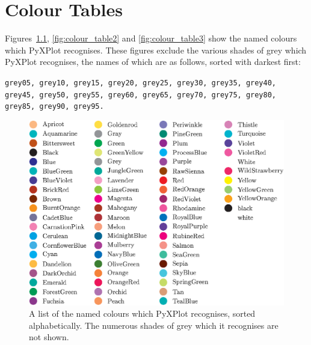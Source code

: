 %
%
%
%
%



\chapter{Colour Tables}
\label{colour_charts}

 Figures~\ref{fig:colour_table1}, \ref{fig:colour_table2}
and \ref{fig:colour_table3} show the named colours which PyXPlot recognises.
These figures exclude the various shades of grey which PyXPlot recognises, the
names of which are as follows, sorted with darkest first:

\vspace{5mm}\noindent
{}
{\tt grey05, grey10, grey15, grey20, grey25, grey30, grey35, grey40, grey45, grey50, grey55, grey60, grey65, grey70, grey75, grey80, grey85, grey90, grey95.}

\begin{figure}
\begin{center}
\includegraphics[width=\textwidth]{figures/pyx_colours2.eps}
\end{center}
\caption[A list of the named colours which PyXPlot recognises, sorted alphabetically]
{A list of the named colours which PyXPlot recognises, sorted alphabetically. The numerous shades of grey which it recognises are not shown.}
\label{fig:colour_table1}
\end{figure}

